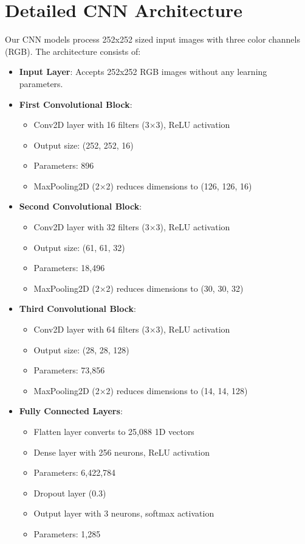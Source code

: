 \documentclass[twocolumn]{article}
\begin{document}
\section{Detailed CNN Architecture}
Our CNN models process 252x252 sized input images with three color channels (RGB). The architecture consists of:

\begin{itemize}\itemsep4pt
    \item \textbf{Input Layer}: Accepts 252x252 RGB images without any learning parameters.
    
    \item \textbf{First Convolutional Block}:
    \begin{itemize}\itemsep2pt
        \item Conv2D layer with 16 filters (3×3), ReLU activation
        \item Output size: (252, 252, 16)
        \item Parameters: 896
        \item MaxPooling2D (2×2) reduces dimensions to (126, 126, 16)
    \end{itemize}
    
    \item \textbf{Second Convolutional Block}:
    \begin{itemize}\itemsep2pt
        \item Conv2D layer with 32 filters (3×3), ReLU activation
        \item Output size: (61, 61, 32)
        \item Parameters: 18,496
        \item MaxPooling2D (2×2) reduces dimensions to (30, 30, 32)
    \end{itemize}
    
    \item \textbf{Third Convolutional Block}:
    \begin{itemize}\itemsep2pt
        \item Conv2D layer with 64 filters (3×3), ReLU activation
        \item Output size: (28, 28, 128)
        \item Parameters: 73,856
        \item MaxPooling2D (2×2) reduces dimensions to (14, 14, 128)
    \end{itemize}
    
    \item \textbf{Fully Connected Layers}:
    \begin{itemize}\itemsep2pt
        \item Flatten layer converts to 25,088 1D vectors
        \item Dense layer with 256 neurons, ReLU activation
        \item Parameters: 6,422,784
        \item Dropout layer (0.3)
        \item Output layer with 3 neurons, softmax activation
        \item Parameters: 1,285
    \end{itemize}
\end{itemize}
\end{document}

